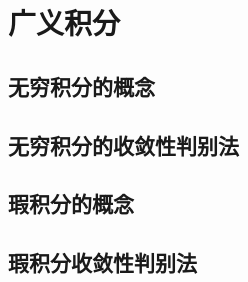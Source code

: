 

\chapter{广义积分}\label{ch:10}
\section{无穷积分的概念}
\begin{exercise}
\item
\end{exercise}
\section{无穷积分的收敛性判别法}
\begin{exercise}
\item
\end{exercise}
\section{瑕积分的概念}
\begin{exercise}
\item
\end{exercise}
\section{瑕积分收敛性判别法}
\begin{exercise}
\item
\end{exercise}
\begin{exercise*}
\item
\end{exercise*}




\endinput
